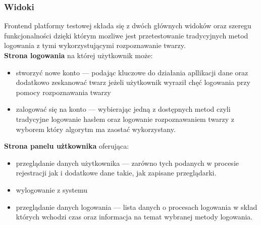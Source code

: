 \subsubsection{Widoki}
Frontend platformy testowej składa się z dwóch głównych widoków oraz szeregu funkcjonalności dzięki którym mozliwe jest przetestowanie tradycyjnych metod logowania z tymi wykorzystującymi rozpoznawanie twarzy. \\
\textbf{Strona logowania} na której użytkownik może:
\begin{itemize}
   \item stworzyć nowe konto --- podając kluczowe do działania apllikacji dane oraz dodatkowo zeskanować twarz jeżeli użytkownik wyraził chęć logowania przy pomocy rozpoznawania twarzy
   \item zalogować się na konto --- wybierając jedną z dostępnych metod czyli tradycyjne logowanie hasłem oraz logowanie rozpoznawaniem twarzy z wyborem który algorytm ma zaostać wykorzystany.
\end{itemize}

\textbf{Strona panelu użtkownika} oferująca:
\begin{itemize}
  \item przeglądanie danych użytkownika --- zarówno tych podanych w procesie rejestracji jak i dodatkowe dane takie, jak zapisane przeglądarki.
  \item wylogowanie z systemu
  \item przeglądanie danych logowania --- lista danych o procesach logowania w skład których wchodzi czas oraz informacja na temat wybranej metody logowania.
\end{itemize}


